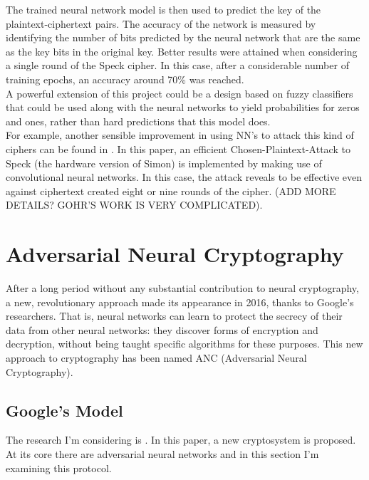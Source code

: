 \documentclass[%
    corpo=11pt,
    twoside,
    stile=classica,
    oldstyle,
    autoretitolo,
    tipotesi=magistrale,
    greek,
    evenboxes,
    english
]{toptesi}
\begin{document}
The trained neural network model is then used to predict the key of the plaintext-ciphertext pairs. The accuracy of the network is measured by identifying the number of bits predicted by the neural network that are the same as the key bits in the original key. Better results were attained when considering a single round of the Speck cipher. In this case, after a considerable number of training epochs, an accuracy around 70\% was reached. \\
A powerful extension of this project could be a design based on fuzzy classifiers that could be used along with the neural networks to yield probabilities for zeros and ones, rather than hard predictions that this model does. \\
For example, another sensible improvement in using NN's to attack this kind of ciphers can be found in \citep{gohr}. In this paper, an efficient Chosen-Plaintext-Attack to Speck (the hardware version of Simon) is implemented by making use of convolutional neural networks. In this case, the attack reveals to be effective even against ciphertext created eight or nine rounds of the cipher. 
(ADD MORE DETAILS? GOHR'S WORK IS VERY COMPLICATED).


\chapter{Adversarial Neural Cryptography}
After a long period without any substantial contribution to neural cryptography, a new, revolutionary approach made its appearance in 2016, thanks to Google's researchers. That is, neural networks can learn to protect the secrecy of their data from other neural networks: they discover forms of encryption and decryption, without being taught specific algorithms for these purposes. This new approach to cryptography has been named ANC (Adversarial Neural Cryptography).

\section{Google's Model}
The research I'm considering is \cite{google}. In this paper, a new cryptosystem is proposed. At its core there are adversarial neural networks and in this section I'm examining this protocol.
\end{document}
